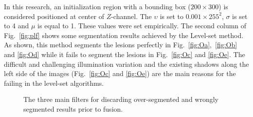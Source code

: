 \begin{description}
In this research, an initialization region with a bounding box ($200 \times 300$) is considered positioned at center of $Z$-channel.
The $\upsilon$ is set to $0.001 \times 255^{2}$, $\sigma$ is set to 4 and $\mu$ is equal to 1.
These values were set empirically.
The second column of Fig.~\ref{fig:plf} shows some segmentation results achieved by the Level-set method.
As shown, this method segments the lesions perfectly in Fig.~\ref{fig:Oa},~\ref{fig:Ob} and \ref{fig:Od} while it fails to segment the lesions in Fig.~\ref{fig:Oc} and \ref{fig:Oe}.
The difficult and challenging illumination variation and the existing shadows along the left side of the images (Fig.~\ref{fig:Oc} and \ref{fig:Oe}) are the main reasons for the failing in the level-set algorithms.
\begin{figure}
\hfill
{}\hfill
{}
\caption[Fusion filters]{The three main filters for discarding over-segmented and wrongly segmented results prior to fusion.}
\label{fig:segfilters}
\end{figure}


\end{description}
